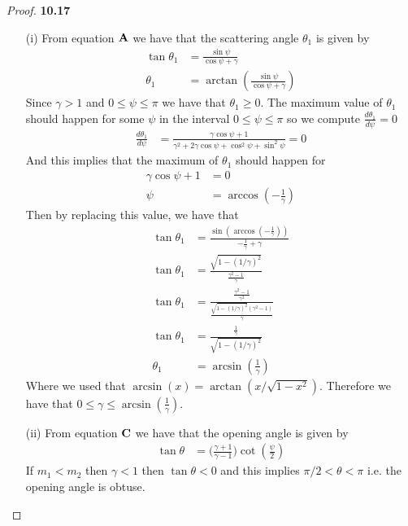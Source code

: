 \documentclass[11pt]{article}
\theoremstyle{definition}
\begin{document}
	\begin{proof}{\textbf{10.17}}
    \begin{itemize}
        \item [(i)] From equation $\bf{A}$ we have that the scattering angle
        $\theta_1$ is given by
        \begin{align*}
            \tan\theta_1 &= \frac{\sin\psi}{\cos\psi + \gamma}\\
            \theta_1 &= \arctan(\frac{\sin\psi}{\cos\psi + \gamma})
        \end{align*}
        Since $\gamma > 1$ and $0\leq \psi\leq \pi$ we have that
        $\theta_1 \geq 0$.
        The maximum value of $\theta_1$ should happen for some $\psi$ in
        the interval $0\leq \psi\leq \pi$ so we compute
        $\frac{d\theta_1}{d\psi} = 0$
        \begin{align*}
            \frac{d\theta_1}{d\psi}
            &= \frac{\gamma\cos\psi + 1}
            {\gamma^2 + 2\gamma\cos\psi + \cos^2\psi + \sin^2\psi} = 0
        \end{align*}
        And this implies that the maximum of $\theta_1$ should happen for
        \begin{align*}
            \gamma\cos\psi + 1 &= 0\\
            \psi &= \arccos(-\frac{1}{\gamma})
        \end{align*}
        Then by replacing this value, we have that
        \begin{align*}
            \tan\theta_1 &= \frac{\sin(\arccos(-\frac{1}{\gamma}))}
            {-\frac{1}{\gamma} + \gamma}\\
            \tan\theta_1 &= \frac{\sqrt{1 - (1/\gamma)^2}}
            {\frac{\gamma^2 - 1}{\gamma}}\\
            \tan\theta_1 &= \frac{\frac{\gamma^2 - 1}{\gamma^2}}
            {\frac{\sqrt{1 - (1/\gamma)^2}(\gamma^2 - 1)}{\gamma}}\\
            \tan\theta_1 &= \frac{\frac{1}{\gamma}}{\sqrt{1 - (1/\gamma)^2}}\\
            \theta_1 &=  \arcsin(\frac{1}{\gamma})
        \end{align*}
        Where we used that $\arcsin(x) = \arctan(x/\sqrt{1-x^2})$.
        Therefore we have that $0 \leq \gamma \leq \arcsin(\frac{1}{\gamma})$.
        
        \item[(ii)] From equation $\bf{C}$ we have that the opening angle is
        given by
        \begin{align*}
            \tan\theta &= \bigg(\frac{\gamma + 1}{\gamma - 1}\bigg)\cot(\frac{\psi}{2})
        \end{align*}
        If $m_1 < m_2$ then $\gamma < 1$ then $\tan\theta < 0$ and this
        implies $\pi/2 < \theta < \pi$ i.e. the opening angle is obtuse.
        

\end{itemize}
\end{proof}
\end{document}
